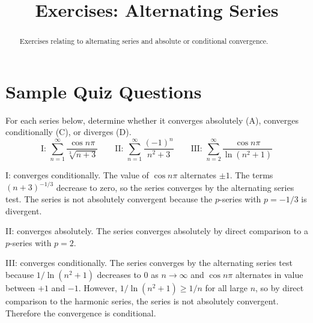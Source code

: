 \documentclass{ximera}
\title{Exercises: Alternating Series}
\begin{document}
\begin{abstract}
Exercises relating to alternating series and absolute or conditional convergence.
\end{abstract}
\maketitle


\section*{Sample Quiz Questions}

\begin{question}%

For each series below, determine whether it converges absolutely (A), converges conditionally (C), or diverges (D).  \[\text{I: } \sum_{n = 1}^\infty\frac{\cos n \pi}{\sqrt[3]{n+3}} \qquad \text{II: } \sum_{n = 1}^\infty\frac{(-1)^n}{n^2+3} \qquad \text{III: } \sum_{n = 2}^\infty\frac{\cos n \pi}{\ln (n^2 + 1)}\]
\begin{multiplechoice}
\end{multiplechoice}
\begin{feedback}
I: converges conditionally. The value of \(\cos n \pi\) alternates \(\pm 1\). The terms \((n+3)^{-1/3}\) decrease to zero, so the series converges by the alternating series test. The series is not absolutely convergent because the \(p\)-series with \(p = -1/3\) is divergent.

II: converges absolutely. The series converges absolutely by direct comparison to a \(p\)-series with \(p=2\).

III: converges conditionally. The series converges by the alternating series test because \(1/\ln (n^2+1)\) decreases to \(0\) as \(n \rightarrow \infty\) and \(\cos n \pi\) alternates in value between \(+1\) and \(-1\). However, \(1/\ln (n^2+1) \geq 1/n\) for all large \(n\), so by direct comparison to the harmonic series, the series is not absolutely convergent. Therefore the convergence is conditional.
\end{feedback}

\end{question}
\end{document}
